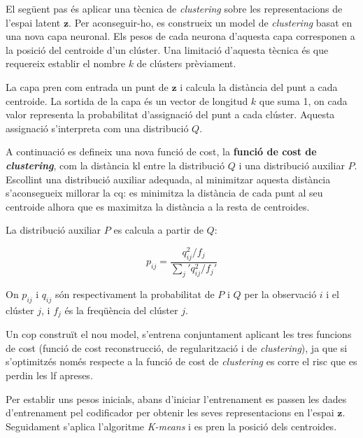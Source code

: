 \documentclass[CAT,BIB]{TFUOC}%
\begin{document}
        El següent pas és aplicar una tècnica de \textit{clustering}
        sobre les representacions de l'espai latent $\mathbf{z}$.
        Per aconseguir-ho,
        es construeix un model de \textit{clustering}
        basat en una nova capa neuronal.
        Els pesos de cada neurona d'aquesta capa
        corresponen a la posició del centroide d'un clúster.
        Una limitació d'aquesta tècnica és que requereix
        establir el nombre $k$ de clústers prèviament.

        La capa pren com entrada un punt de $\mathbf{z}$
        i calcula la distància del punt a cada centroide.
        La sortida de la capa és un vector de longitud $k$ que suma 1,
        on cada valor representa la probabilitat d'assignació del punt a cada clúster.
        Aquesta assignació s'interpreta com una distribució $Q$.

        A continuació es defineix una nova funció de cost,
        la \textbf{funció de cost de \textit{clustering}},
        com la distància \gls{kl} entre la distribució $Q$
        i una distribució auxiliar $P$.
        Escollint una distribució auxiliar adequada,
        al minimitzar aquesta distància
        s'aconsegueix millorar la \gls{cq}:
        es minimitza la distància de cada punt al seu centroide
        alhora que es maximitza la distància a la resta de centroides.

        La distribució auxiliar $P$ es calcula
        a partir de $Q$:

        \begin{equation}
            \label{eq:clustering_aux}
            p_{ij} =
            \frac {q_{ij}^2 / f_j}
                 {\sum_j' q_{ij}^2 / f_j'}
        \end{equation}

        On $p_{ij}$ i $q_{ij}$ són respectivament la probabilitat
        de $P$ i $Q$ per la observació $i$ i el clúster $j$,
        i $f_j$ és la freqüència del clúster $j$.

        Un cop construït el nou model,
        s'entrena conjuntament aplicant les tres funcions de cost
        (funció de cost reconstrucció, de regularització i de \textit{clustering}),
        ja que si s'optimitzés només respecte a la funció de cost de \textit{clustering}
        es corre el risc que es perdin les \gls{lf} apreses.

        Per establir uns pesos inicials,
        abans d'iniciar l'entrenament
        es passen les dades d'entrenament pel codificador
        per obtenir les seves representacions en l'espai $\mathbf{z}$.
        Seguidament s'aplica l'algoritme \textit{K-means}
        i es pren la posició dels centroides.
\end{document}
